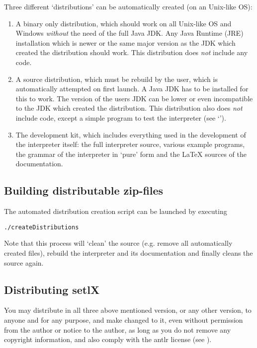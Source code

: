 Three different `distributions' can be automatically created (on an Unix-like OS):

\begin{enumerate}
	\item A binary only distribution, which should work on all Unix-like OS and Windows \emph{without} the need of the full Java JDK. Any Java Runtime (JRE) installation which is newer or the same major version as the JDK which created the distribution should work. This distribution does \emph{not} include any \SetlX{} code.

	\item A source distribution, which must be rebuild by the user, which is automatically attempted on first launch. A Java JDK has to be installed for this to work. The version of the users JDK can be lower or even incompatible to the JDK which created the distribution. This distribution also does \emph{not} include \SetlX{} code, except a simple program to test the interpreter (see `').

	\item The development kit, which includes everything used in the development of the interpreter itself: the full interpreter source, various \SetlX{} example programs, the grammar of the interpreter in `pure' form and the \LaTeX{} sources of the documentation.
\end{enumerate}

\subsection{Building distributable zip-files}

The automated distribution creation script can be launched by executing

\begin{lstlisting}[frame=none,numbers=none]
./createDistributions
\end{lstlisting}

Note that this process will `clean' the source (e.g. remove all automatically created files), rebuild the interpreter and its documentation and finally cleans the source again.

\subsection{Distributing setlX}

You may distribute \setlX{} in all three above mentioned version, or any other version, to anyone and for any purpose, and make changed to it, even without permission from the author or notice to the author, as long as you do not remove any copyright information, and also comply with the antlr license (see ).

